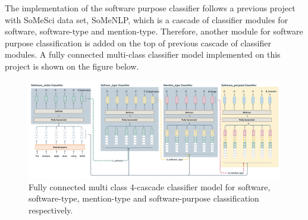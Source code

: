 The implementation of the software purpose classifier follows a previous project with SoMeSci data set, SoMeNLP, which is a cascade of classifier modules for software, software-type and mention-type. Therefore, another module for software purpose classification is added on the top of previous cascade of classifier modules. A fully connected multi-class classifier model implemented on this project is  shown on the figure below. 

\begin{figure}[htbp]
	\centering
	\includegraphics[width=1\textwidth]{4.graphics/figures/ch_5/fully_connected_model}
	\caption{Fully connected multi class 4-cascade classifier model for software, software-type, mention-type and software-purpose classification respectively.}
	\label{fig:chapter05:setup}
\end{figure}

 


